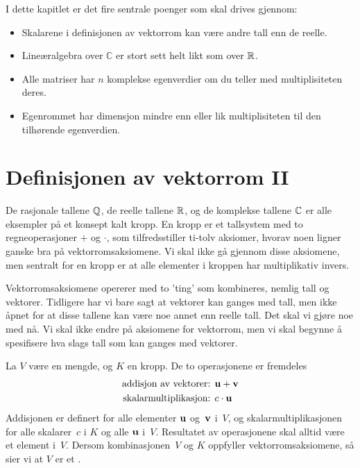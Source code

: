 

\label{ch:kompleks-linear-algebra}

I dette kapitlet er det fire sentrale poenger som skal drives gjennom:

\begin{itemize}
\item Skalarene i definisjonen av vektorrom kan være andre tall enn de reelle.

\item Lineæralgebra over $\mathbb C$ er stort sett helt likt som over $\mathbb{R}$.

\item Alle matriser har $n$ komplekse egenverdier om du teller med multiplisiteten deres.
 
\item Egenrommet har dimensjon mindre enn eller lik multiplisiteten til den tilhørende egenverdien.
\end{itemize}

\section*{Definisjonen av vektorrom II}

De rasjonale tallene $\mathbb{Q}$, de reelle tallene $\mathbb{R}$, 
og de komplekse tallene $\mathbb{C}$ er alle eksempler på et konsept kalt kropp. 
En kropp er et tallsystem med to regneoperasjoner $+$ og $\cdot$, 
som tilfredsstiller ti-tolv aksiomer, 
hvorav noen ligner ganske bra på vektorromsaksiomene. 
Vi skal ikke gå gjennom disse aksiomene, 
men sentralt for en kropp er at alle elementer i kroppen har multiplikativ invers.

Vektorromsaksiomene opererer med to 'ting' som kombineres, nemlig tall og vektorer. 
Tidligere har vi bare sagt at vektorer kan ganges med tall, 
men ikke åpnet for at disse tallene kan være noe annet enn reelle tall. 
Det skal vi gjøre noe med nå. 
Vi skal ikke endre på aksiomene for vektorrom, 
men vi skal begynne å spesifisere hva slags tall som kan ganges med vektorer. 

\begin{defn}
La $V$ være en mengde, og $K$ en kropp. De to operasjonene er fremdeles
\begin{align*}
\text{addisjon av vektorer: } & \mathbf{u} + \mathbf{v} \\
\text{skalarmultiplikasjon: } & c \cdot \mathbf{u}
\end{align*}
Addisjonen er definert for alle elementer $\mathbf{u}$ og~$\mathbf{v}$
i~$V$, og skalarmultiplikasjonen for alle skalarer~$c$ i $K$ og alle $\mathbf{u}$
i~$V$.  Resultatet av operasjonene skal alltid være et element i~$V$.
Dersom kombinasjonen~$V$ og $K$ oppfyller vektorromsaksiomene, 
så sier vi at $V$ er et .
\end{defn}

